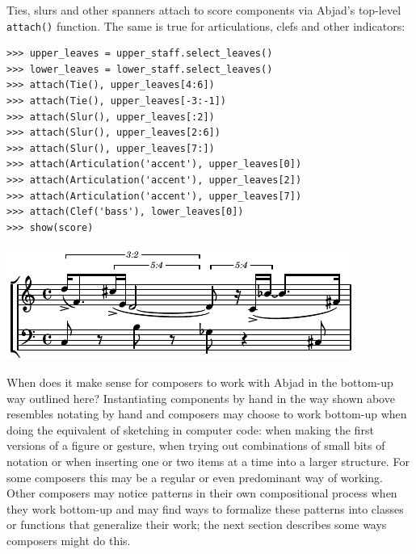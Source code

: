 \documentclass{article}
\begin{document}
\noindent Ties, slurs and other spanners attach to score components via Abjad's
top-level \texttt{attach()} function. The same is true for articulations, clefs and other indicators:

\begin{lstlisting}
>>> upper_leaves = upper_staff.select_leaves()
>>> lower_leaves = lower_staff.select_leaves()
>>> attach(Tie(), upper_leaves[4:6])
>>> attach(Tie(), upper_leaves[-3:-1])
>>> attach(Slur(), upper_leaves[:2])
>>> attach(Slur(), upper_leaves[2:6])
>>> attach(Slur(), upper_leaves[7:])
>>> attach(Articulation('accent'), upper_leaves[0])
>>> attach(Articulation('accent'), upper_leaves[2])
>>> attach(Articulation('accent'), upper_leaves[7])
>>> attach(Clef('bass'), lower_leaves[0])
>>> show(score)
\end{lstlisting}
\includegraphics{assets/lilypond-b8f044cb7178ea31797238c629d3f54c.pdf}

\noindent When does it make sense for composers to work with Abjad in the
bottom-up way outlined here? Instantiating components by hand in the way shown
above resembles notating by hand and composers may choose to work bottom-up
when doing the equivalent of sketching in computer code: when making the first
versions of a figure or gesture, when trying out combinations of small bits of
notation or when inserting one or two items at a time into a larger structure.
For some composers this may be a regular or even predominant way of working.
Other composers may notice patterns in their own compositional process when
they work bottom-up and may find ways to formalize these patterns into classes
or functions that generalize their work; the next section describes some ways
composers might do this.
\end{document}
